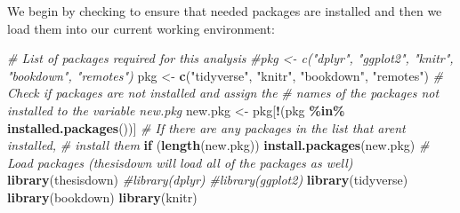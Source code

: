 \documentclass[12pt,twoside]{deuthesis}
\newenvironment{Shaded}{\begin{snugshade}}{\end{snugshade}}
\newcommand{\CommentTok}[1]{\textcolor[rgb]{0.56,0.35,0.01}{\textit{#1}}}
\newcommand{\ControlFlowTok}[1]{\textcolor[rgb]{0.13,0.29,0.53}{\textbf{#1}}}
\newcommand{\FunctionTok}[1]{\textcolor[rgb]{0.13,0.29,0.53}{\textbf{#1}}}
\newcommand{\NormalTok}[1]{#1}
\newcommand{\OtherTok}[1]{\textcolor[rgb]{0.56,0.35,0.01}{#1}}
\newcommand{\SpecialCharTok}[1]{\textcolor[rgb]{0.81,0.36,0.00}{\textbf{#1}}}
\newcommand{\StringTok}[1]{\textcolor[rgb]{0.31,0.60,0.02}{#1}}
\begin{document}
We begin by checking to ensure that needed packages are installed and then we load them into our current working environment:
\begin{Shaded}
\begin{Highlighting}[]
\CommentTok{\# List of packages required for this analysis}
\CommentTok{\#pkg \textless{}{-} c("dplyr", "ggplot2", "knitr", "bookdown", "remotes")}
\NormalTok{pkg }\OtherTok{\textless{}{-}} \FunctionTok{c}\NormalTok{(}\StringTok{"tidyverse"}\NormalTok{, }\StringTok{"knitr"}\NormalTok{, }\StringTok{"bookdown"}\NormalTok{, }\StringTok{"remotes"}\NormalTok{)}
\CommentTok{\# Check if packages are not installed and assign the}
\CommentTok{\# names of the packages not installed to the variable new.pkg}
\NormalTok{new.pkg }\OtherTok{\textless{}{-}}\NormalTok{ pkg[}\SpecialCharTok{!}\NormalTok{(pkg }\SpecialCharTok{\%in\%} \FunctionTok{installed.packages}\NormalTok{())]}
\CommentTok{\# If there are any packages in the list that aren\textquotesingle{}t installed,}
\CommentTok{\# install them}
\ControlFlowTok{if}\NormalTok{ (}\FunctionTok{length}\NormalTok{(new.pkg))}
  \FunctionTok{install.packages}\NormalTok{(new.pkg)}
\CommentTok{\# Load packages (thesisdown will load all of the packages as well)}
\FunctionTok{library}\NormalTok{(thesisdown)}
\CommentTok{\#library(dplyr)}
\CommentTok{\#library(ggplot2)}
\FunctionTok{library}\NormalTok{(tidyverse)}
\FunctionTok{library}\NormalTok{(bookdown)}
\FunctionTok{library}\NormalTok{(knitr)}
\end{Highlighting}
\end{Shaded}
\clearpage
\end{document}
